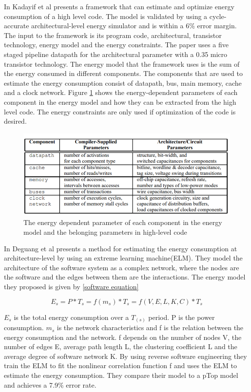 In \cite{EAC} Kadayif et al presents a framework that can estimate and optimize energy consumption of a high level code. The model is validated by using a cycle-accurate architectural-level energy simulator and is within a 6\% error margin. The input to the framework is its program code, architectural, transistor technology, energy model and the energy constraints. The paper uses a five staged pipeline datapath for the architectural parameter with a 0.35 micro transistor technology. The energy model that the framework uses is the sum of the energy consumed in different components. The components that are used to estimate the energy consumption consist of datapath, bus, main memory, cache and a clock network. Figure \ref{fig:EAC_table} shows the energy-dependent parameters of each component in the energy model and how they can be extracted from the high level code. The energy constraints are only used if optimization of the code is desired. 
\begin{figure}[H]
\centering
\includegraphics[height=4.5cm]{Project_Report/Images/EAC_table.PNG}
\caption{The energy dependent parameter of each component in the energy model and the belonging parameters in high-level code \cite{EAC}}
\label{fig:EAC_table}
\end{figure}
In \cite{Software_Energy} Deguang et al presents a method for estimating the energy consumption at architecture-level by using an extreme learning machine(ELM).  They model the architecture of the software system as a complex network, where the nodes are the software and the edges between them are the interactions. The energy model they proposed is given by \ref{software equation}

\begin{equation}
 E_{s}= P*T_{s} = f(m_{s})*T_{s}=f(V,E,L,K,C)*T_{s}
\label{software equation}
\end{equation}

$E_{s}$ is the total energy consumption over a $T_(s)$ period. P is the power consumption. $m_{s}$ is the network characteristics and f is the relation between the energy consumption and the network. f depends on the number of nodes V, the number of edges E, average path length L, the clustering coefficient L and the average degree of software network K. By using reverse software engineering they train the ELM to fit the nonlinear correlation function f and uses the ELM to estimate the energy consumption. They compare their model to a pTop model and achieves a 7.9\% error rate. 

